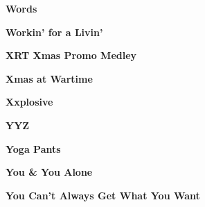 \newline
\vspace{10pt} 
\begin{center}\textbf{Words}\end{center}
\newline
\vspace{10pt} 
\begin{center}\textbf{Workin' for a Livin'}\end{center}
\newline
\vspace{10pt} 
\begin{center}\textbf{XRT Xmas Promo Medley}\end{center}
\newline
\vspace{10pt} 
\begin{center}\textbf{Xmas at Wartime}\end{center}
\newline
\vspace{10pt} 
\begin{center}\textbf{Xxplosive}\end{center}
\newline
\vspace{10pt} 
\begin{center}\textbf{YYZ}\end{center}
\newline
\vspace{10pt} 
\begin{center}\textbf{Yoga Pants}\end{center}
\newline
\vspace{10pt} 
\begin{center}\textbf{You \& You Alone}\end{center}
\newline
\vspace{10pt} 
\begin{center}\textbf{You Can't Always Get What You Want}\end{center}
\newline
\vspace{10pt} 
